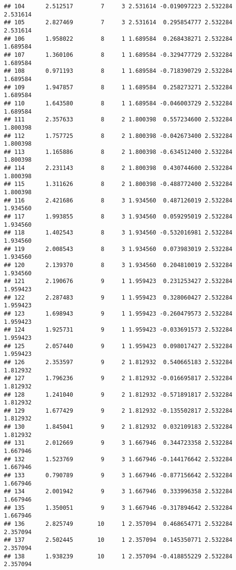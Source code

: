 \documentclass[]{book}
\theoremstyle{definition}
\theoremstyle{definition}
\theoremstyle{definition}
\theoremstyle{remark}
\begin{document}
\begin{verbatim}
## 104      2.512517        7     3 2.531614 -0.019097223 2.532284 2.531614
## 105      2.827469        7     3 2.531614  0.295854777 2.532284 2.531614
## 106      1.958022        8     1 1.689584  0.268438271 2.532284 1.689584
## 107      1.360106        8     1 1.689584 -0.329477729 2.532284 1.689584
## 108      0.971193        8     1 1.689584 -0.718390729 2.532284 1.689584
## 109      1.947857        8     1 1.689584  0.258273271 2.532284 1.689584
## 110      1.643580        8     1 1.689584 -0.046003729 2.532284 1.689584
## 111      2.357633        8     2 1.800398  0.557234600 2.532284 1.800398
## 112      1.757725        8     2 1.800398 -0.042673400 2.532284 1.800398
## 113      1.165886        8     2 1.800398 -0.634512400 2.532284 1.800398
## 114      2.231143        8     2 1.800398  0.430744600 2.532284 1.800398
## 115      1.311626        8     2 1.800398 -0.488772400 2.532284 1.800398
## 116      2.421686        8     3 1.934560  0.487126019 2.532284 1.934560
## 117      1.993855        8     3 1.934560  0.059295019 2.532284 1.934560
## 118      1.402543        8     3 1.934560 -0.532016981 2.532284 1.934560
## 119      2.008543        8     3 1.934560  0.073983019 2.532284 1.934560
## 120      2.139370        8     3 1.934560  0.204810019 2.532284 1.934560
## 121      2.190676        9     1 1.959423  0.231253427 2.532284 1.959423
## 122      2.287483        9     1 1.959423  0.328060427 2.532284 1.959423
## 123      1.698943        9     1 1.959423 -0.260479573 2.532284 1.959423
## 124      1.925731        9     1 1.959423 -0.033691573 2.532284 1.959423
## 125      2.057440        9     1 1.959423  0.098017427 2.532284 1.959423
## 126      2.353597        9     2 1.812932  0.540665183 2.532284 1.812932
## 127      1.796236        9     2 1.812932 -0.016695817 2.532284 1.812932
## 128      1.241040        9     2 1.812932 -0.571891817 2.532284 1.812932
## 129      1.677429        9     2 1.812932 -0.135502817 2.532284 1.812932
## 130      1.845041        9     2 1.812932  0.032109183 2.532284 1.812932
## 131      2.012669        9     3 1.667946  0.344723358 2.532284 1.667946
## 132      1.523769        9     3 1.667946 -0.144176642 2.532284 1.667946
## 133      0.790789        9     3 1.667946 -0.877156642 2.532284 1.667946
## 134      2.001942        9     3 1.667946  0.333996358 2.532284 1.667946
## 135      1.350051        9     3 1.667946 -0.317894642 2.532284 1.667946
## 136      2.825749       10     1 2.357094  0.468654771 2.532284 2.357094
## 137      2.502445       10     1 2.357094  0.145350771 2.532284 2.357094
## 138      1.938239       10     1 2.357094 -0.418855229 2.532284 2.357094

\end{verbatim}
\end{document}
